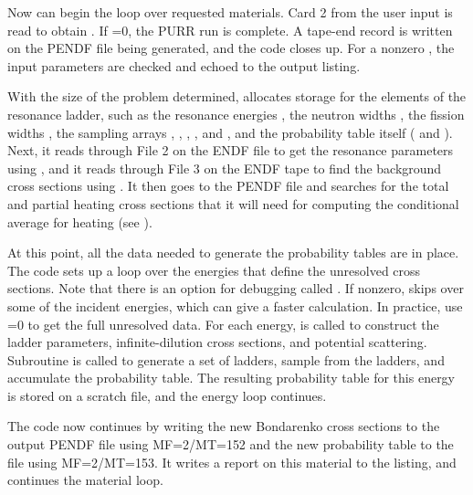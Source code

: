 Now  can begin the loop over requested materials.  Card 2
from the user input is read to obtain .  If =0,
the PURR run is complete.  A tape-end record is written on the PENDF file
being generated, and the code closes up.  For a nonzero ,
the input parameters are checked and echoed to the output listing.

With the size of the problem determined,  allocates
storage for the elements of the resonance ladder, such as the
resonance energies , the neutron widths , the
fission widths , the sampling arrays ,
, , , and , and the
probability table itself ( and ).  Next,
it reads through File 2 on the ENDF file to get the resonance
parameters using , and
it reads through File 3 on the ENDF tape to find the background
cross sections using .
It then goes to the PENDF file and searches for the total and
partial heating cross sections that it will need for computing the
conditional average for heating (see
).

At this point, all the data needed to generate the probability tables
are in place.  The code sets up a loop over the energies that define
the unresolved cross sections.  Note that there is an option for
debugging called .  If nonzero,  skips over
some of the incident energies, which can give a faster calculation.
In practice, use =0 to get the full unresolved data.
For each energy,  is called to construct the ladder
parameters, infinite-dilution cross sections, and potential
scattering.  Subroutine  is called to generate a set
of ladders, sample from the ladders, and accumulate the probability
table.  The resulting probability table for this energy is stored
on a scratch file, and the energy loop continues.

The code now continues by writing the new Bondarenko cross sections
to the output PENDF file using MF=2/MT=152 and the new probability table
to the file using MF=2/MT=153.  It writes a report on this material to
the listing, and continues the material loop.

